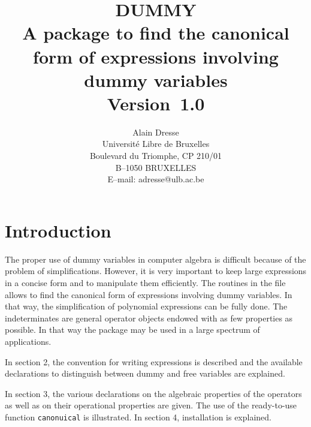 \newcommand{\nl}{\hfill\newline}
\newcommand{\bq}{\begin{quotation}}
\newcommand{\eq}{\end{quotation}}
\newcommand{\bi}{\begin{itemize}}
\newcommand{\ei}{\end{itemize}}
\date{}
\title{{\bf DUMMY}\\[3pt]
A package to find the canonical form of expressions involving
dummy variables\\[5pt]
  \mbox{\hfill Version 1.0\hfil}}
\author{Alain Dresse \\
Universit\'e Libre de Bruxelles \\
Boulevard du Triomphe, CP 210/01 \\
B--1050 BRUXELLES \\[3pt]
E--mail: adresse@ulb.ac.be}

\maketitle
{}
\section{Introduction}
The proper use of dummy variables in computer algebra is difficult
because of the problem of simplifications. However, it is very important
to keep large expressions in a concise form and to manipulate them
efficiently.
The routines in the file allows to find the canonical form of expressions
involving dummy variables. In that way, the simplification of
polynomial expressions can be fully done. The indeterminates are general
operator objects endowed with as few properties as possible. In that way
the package may be used in a large spectrum of applications.

In section 2, the convention for writing expressions is described and
the available declarations to distinguish between dummy and free variables
are explained.

In section 3, the various declarations on the algebraic properties
of the operators as well as on their operational properties are
given. The use of the ready-to-use function {\tt canonuical} is illustrated.
In section 4, installation is explained.
